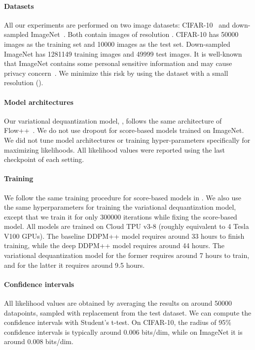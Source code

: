 \paragraph{Datasets} All our experiments are performed on two image datasets: CIFAR-10~\cite{krizhevsky2014cifar} and down-sampled ImageNet~\cite{van2016pixel}. Both contain images of resolution . CIFAR-10 has 50000 images as the training set and 10000 images as the test set. Down-sampled ImageNet has 1281149 training images and 49999 test images. It is well-known that ImageNet contains some personal sensitive information and may cause privacy concern~\cite{yang2021study}. We minimize this risk by using the dataset with a small resolution ().

\paragraph{Model architectures}
Our variational dequantization model, , follows the same architecture of Flow++~\cite{ho2019flow++}. We do not use dropout for score-based models trained on ImageNet. We did not tune model architectures or training hyper-parameters specifically for maximizing likelihoods. All likelihood values were reported using the last checkpoint of each setting.

\paragraph{Training} We follow the same training procedure for score-based models in \cite{song2020score}. We also use the same hyperparameters for training the variational dequantization model, except that we train it for only 300000 iterations while fixing the score-based model. All models are trained on Cloud TPU v3-8 (roughly equivalent to 4 Tesla V100 GPUs). The baseline DDPM++ model requires around 33 hours to finish training, while the deep DDPM++ model requires around 44 hours. The variational dequantization model for the former requires around 7 hours to train, and for the latter it requires around 9.5 hours.



\paragraph{Confidence intervals}
All likelihood values are obtained by averaging the results on around 50000 datapoints, sampled with replacement from the test dataset. We can compute the confidence intervals with Student's t-test. On CIFAR-10, the radius of 95\% confidence intervals is typically around 0.006 bits/dim, while on ImageNet it is around 0.008 bits/dim. 


